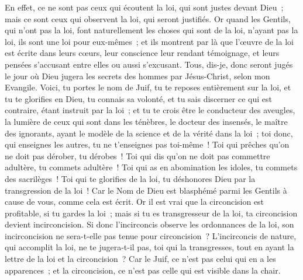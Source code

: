 \begin{multicols}{2}
En effet, ce ne sont pas ceux qui écoutent la loi, qui sont justes devant Dieu~; mais ce sont ceux qui observent la loi, qui seront justifiés.
Or quand les Gentils, qui n'ont pas la loi, font naturellement les choses qui sont de la loi, n'ayant pas la loi, ils sont une loi pour eux-mêmes~;
et ils montrent par là que l'œuvre de la loi est écrite dans leurs cœurs, leur conscience leur rendant témoignage, et leurs pensées s'accusant entre elles ou aussi s'excusant.
Tous, dis-je, donc seront jugés le jour où Dieu jugera les secrets des hommes par Jésus-Christ, selon mon Evangile.
Voici, tu portes le nom de Juif, tu te reposes entièrement sur la loi, et tu te glorifies en Dieu,
tu connais sa volonté, et tu sais discerner ce qui est contraire, étant instruit par la loi~;
et tu te crois être le conducteur des aveugles, la lumière de ceux qui sont dans les ténèbres,
le docteur des insensés, le maître des ignorants, ayant le modèle de la science et de la vérité dans la loi~;
toi donc, qui enseignes les autres, tu ne t'enseignes pas toi-même~! Toi qui prêches qu'on ne doit pas dérober, tu dérobes~!
Toi qui dis qu'on ne doit pas commettre adultère, tu commets adultère~! Toi qui as en abomination les idoles, tu commets des sacrilèges~!
Toi qui te glorifies de la loi, tu déshonores Dieu par la transgression de la loi~!
Car le Nom de Dieu est blasphémé parmi les Gentils à cause de vous, comme cela est écrit.
Or il est vrai que la circoncision est profitable, si tu gardes la loi~; mais si tu es transgresseur de la loi, ta circoncision devient incirconcision.
Si donc l'incirconcis observe les ordonnances de la loi, son incirconcision ne sera-t-elle pas tenue pour circoncision~?
L'incirconcis de nature, qui accomplit la loi, ne te jugera-t-il pas, toi qui la transgresses, tout en ayant la lettre de la loi et la circoncision~?
Car le Juif, ce n'est pas celui qui en a les apparences~; et la circoncision, ce n'est pas celle qui est visible dans la chair.

\end{multicols}
